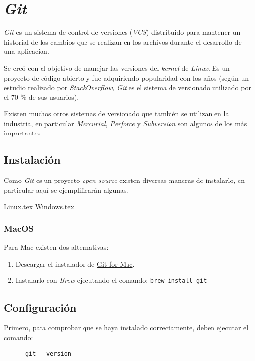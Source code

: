 \chapter{\textit{Git}}
  \textit{Git} es un sistema de control de versiones (\textit{VCS}) distribuido para 
  mantener un historial de los cambios que se realizan en los archivos durante el 
  desarrollo de una aplicación.

  Se creó con el objetivo de manejar las versiones del \textit{kernel} de \textit{Linux}.
  Es un proyecto de código abierto y fue adquiriendo popularidad con los años (según un 
  estudio realizado por \textit{StackOverflow}, \textit{Git} es el sistema de 
  versionado utilizado por el 70 \% de sus usuarios).
  
  Existen muchos otros sistemas de versionado que también se utilizan en la industria,
  en particular \textit{Mercurial}, \textit{Perforce} y \textit{Subversion} son algunos de 
  los más importantes.
  
  \section{Instalación}
    Como \textit{Git} es un proyecto \textit{open-source} existen diversas maneras de 
    instalarlo, en particular aquí se ejemplificarán algunas.

    {Linux.tex}
    {Windows.tex}

    \subsection{MacOS}
      Para Mac existen dos alternativas:
      \begin{enumerate}
        \item Descargar el instalador de 
          \href{https://sourceforge.net/projects/git-osx-installer/files/}{Git for Mac}.
        \item Instalarlo con \textit{Brew} ejecutando el comando: 
          \texttt{brew install git}
      \end{enumerate}

  \section{Configuración}
    Primero, para comprobar que se haya instalado correctamente, deben ejecutar el comando:
    \begin{verbatim}
      git --version
    \end{verbatim}

